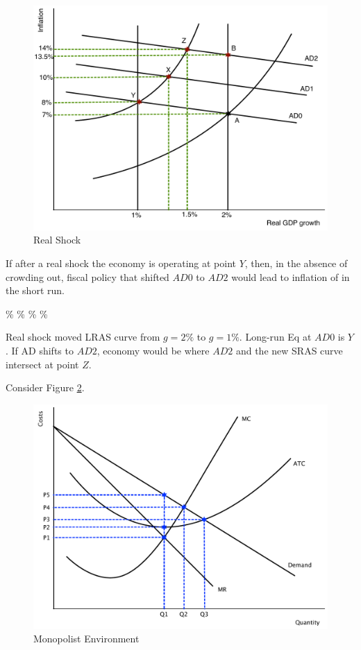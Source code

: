 \documentclass[addpoints,11pt]{exam}
\theoremstyle{definition}
\newcommand{\blank}[0]{\underline{\hspace{3cm}}}
\begin{document}
\begin{questions}
\begin{figure}[h!]
	\centering
	\includegraphics[scale=.45]{ec2_plot1.pdf}
	\caption{Real Shock}
	\label{fig6}
\end{figure}

If after a real shock the economy is operating at point $Y$, then, in the absence of crowding out, fiscal policy that shifted $AD0$ to $AD2$ would lead to inflation of \blank in the short run.

\begin{choices}
	\%
	\%
	\%
	\%
\end{choices}

\begin{solution}
Real shock moved LRAS curve from $g=2\%$ to $g=1\%$. Long-run Eq at $AD0$ is $Y$. If AD shifts to $AD2$, economy would be where $AD2$ and the new SRAS curve intersect at point $Z$.
\end{solution}

\question Consider Figure \ref{fig7}.


\begin{figure}[h!]
	\centering
	\includegraphics[scale=.45]{final_50.pdf}
	\caption{Monopolist Environment}
	\label{fig7}
\end{figure}


\end{questions}
\end{document}
